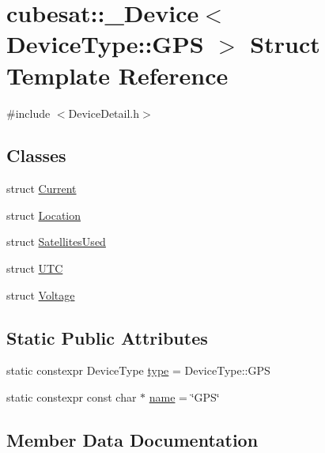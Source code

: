 \hypertarget{structcubesat_1_1__Device_3_01DeviceType_1_1GPS_01_4}{}\section{cubesat\+:\+:\+\_\+\+Device$<$ Device\+Type\+:\+:G\+PS $>$ Struct Template Reference}
\label{structcubesat_1_1__Device_3_01DeviceType_1_1GPS_01_4}


{\ttfamily \#include $<$Device\+Detail.\+h$>$}

\subsection*{Classes}
\begin{DoxyCompactItemize}
\item 
struct \hyperlink{structcubesat_1_1__Device_3_01DeviceType_1_1GPS_01_4_1_1Current}{Current}
\item 
struct \hyperlink{structcubesat_1_1__Device_3_01DeviceType_1_1GPS_01_4_1_1Location}{Location}
\item 
struct \hyperlink{structcubesat_1_1__Device_3_01DeviceType_1_1GPS_01_4_1_1SatellitesUsed}{Satellites\+Used}
\item 
struct \hyperlink{structcubesat_1_1__Device_3_01DeviceType_1_1GPS_01_4_1_1UTC}{U\+TC}
\item 
struct \hyperlink{structcubesat_1_1__Device_3_01DeviceType_1_1GPS_01_4_1_1Voltage}{Voltage}
\end{DoxyCompactItemize}
\subsection*{Static Public Attributes}
\begin{DoxyCompactItemize}
\item 
static constexpr Device\+Type \hyperlink{structcubesat_1_1__Device_3_01DeviceType_1_1GPS_01_4_ad312ade134d76a5081890c386cbcbba2}{type} = Device\+Type\+::\+G\+PS
\item 
static constexpr const char $\ast$ \hyperlink{structcubesat_1_1__Device_3_01DeviceType_1_1GPS_01_4_a5b9298ac8337ceb05dd77635b2a3d428}{name} = \char`\"{}G\+PS\char`\"{}
\end{DoxyCompactItemize}


\subsection{Member Data Documentation}
\mbox{\label{structcubesat_1_1__Device_3_01DeviceType_1_1GPS_01_4_a5b9298ac8337ceb05dd77635b2a3d428}} 
